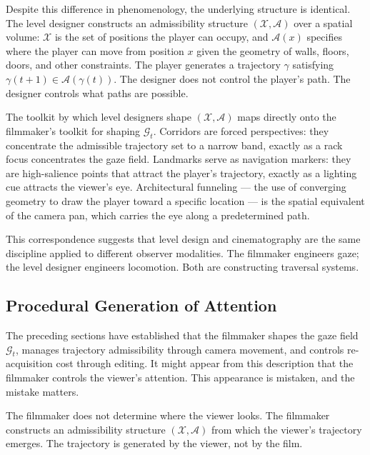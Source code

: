 \documentclass[12pt, a4paper]{article}
\theoremstyle{plain}
\theoremstyle{definition}
\theoremstyle{remark}
\newcommand{\X}{\mathcal{X}}
\newcommand{\A}{\mathcal{A}}
\newcommand{\G}{\mathcal{G}}
\newcommand{\traj}{\gamma}
\begin{document}
Despite this difference in phenomenology, the underlying
structure is identical. The level designer constructs an
admissibility structure $(\X, \A)$ over a spatial volume:
$\X$ is the set of positions the player can occupy, and
$\A(x)$ specifies where the player can move from position
$x$ given the geometry of walls, floors, doors, and other
constraints. The player generates a trajectory $\traj$
satisfying $\traj(t+1) \in \A(\traj(t))$. The designer does
not control the player's path. The designer controls what
paths are possible.

The toolkit by which level designers shape $(\X, \A)$ maps
directly onto the filmmaker's toolkit for shaping $\G_t$.
Corridors are forced perspectives: they concentrate the
admissible trajectory set to a narrow band, exactly as a
rack focus concentrates the gaze field. Landmarks serve as
navigation markers: they are high-salience points that
attract the player's trajectory, exactly as a lighting cue
attracts the viewer's eye. Architectural funneling --- the
use of converging geometry to draw the player toward a
specific location --- is the spatial equivalent of the
camera pan, which carries the eye along a predetermined path.

This correspondence suggests that level design and
cinematography are the same discipline applied to different
observer modalities. The filmmaker engineers gaze; the level
designer engineers locomotion. Both are constructing
traversal systems.

\subsection{Procedural Generation of Attention}
\label{subsec:procedural}

The preceding sections have established that the filmmaker
shapes the gaze field $\G_t$, manages trajectory
admissibility through camera movement, and controls
re-acquisition cost through editing. It might appear from
this description that the filmmaker controls the viewer's
attention. This appearance is mistaken, and the mistake
matters.

The filmmaker does not determine where the viewer looks. The
filmmaker constructs an admissibility structure $(\X, \A)$
from which the viewer's trajectory emerges. The trajectory
is generated by the viewer, not by the film.
\end{document}
